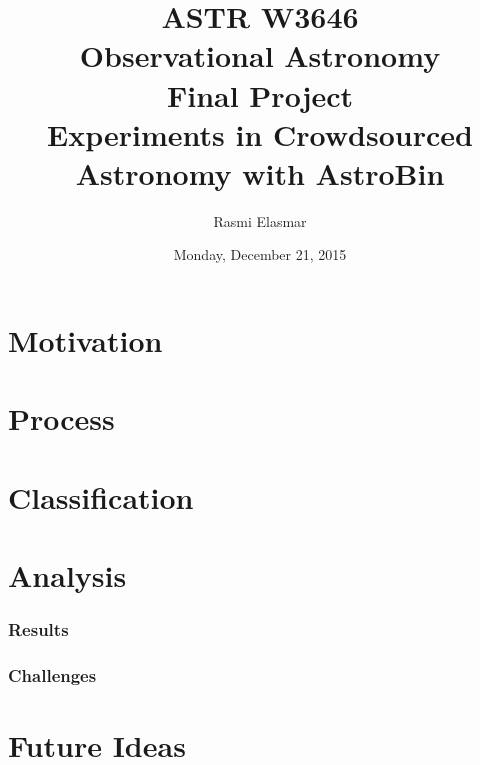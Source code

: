 \documentclass[]{article}
\begin{document}
\title{ASTR W3646 \\ Observational Astronomy \\ Final Project \\ Experiments in Crowdsourced Astronomy with AstroBin}
\author{Rasmi Elasmar}
\date{Monday, December 21, 2015}
\maketitle
\section*{Motivation}
\section*{Process}
\section*{Classification}
\section*{Analysis}
\subsubsection*{Results}
\subsubsection*{Challenges}
\section*{Future Ideas}
\end{document}
